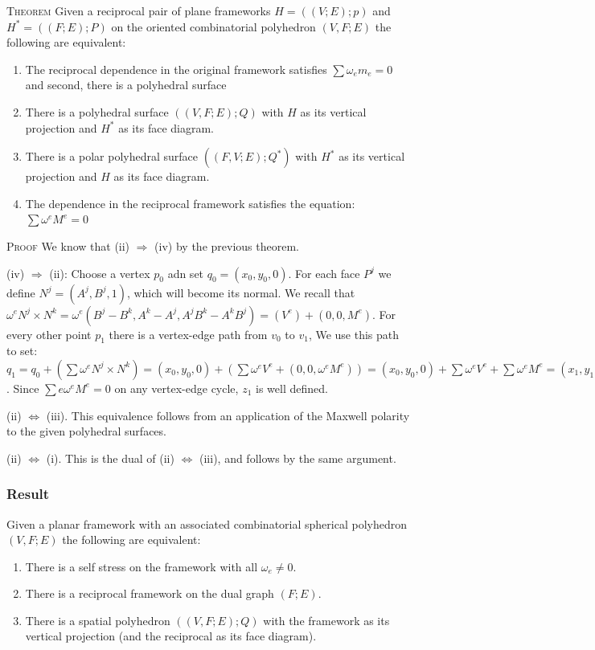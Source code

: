 \documentclass[11pt]{article}
\begin{document}
 \textsc{Theorem} Given a reciprocal pair of plane frameworks $H=((V;E);p)$ and $H^* = ((F;E);P)$ on the oriented combinatorial polyhedron $(V,F;E)$ the following are equivalent: 
 \begin{enumerate} 
 	\item The reciprocal dependence in the original framework satisfies $\sum \omega_em_e = 0$ and second, there is a polyhedral surface 
 	\item There is a polyhedral surface $((V,F;E);Q)$ with $H$ as its vertical projection and $H^*$ as its face diagram.
	\item There is a polar polyhedral surface $((F,V;E);Q^*)$ with $H^*$ as its vertical projection and $H$ as its face diagram.
	\item The dependence in the reciprocal framework satisfies the equation: $\sum \omega^eM^e = 0$
\end{enumerate}
\textsc{Proof} We know that (ii) $\Rightarrow$ (iv) by the previous theorem. 

(iv) $\Rightarrow$ (ii): Choose a vertex $p_0$ adn set $q_0 = (x_0, y_0,0)$. For each face $P^j$ we define $N^j = (A^j,B^j,1)$, which will become its normal. We recall that $\omega^eN^j \times N^k = \omega^e(B^j-B^k,A^k-A^j, A^jB^k-A^kB^j) = (V^e) + (0,0,M^e)$. For every other point $p_1$ there is a vertex-edge path from $v_0$ to $v_1$, We use this path to set: $q_1 = q_0 + (\sum \omega^eN^j \times N^k) = (x_0,y_0,0) + (\sum \omega^eV^e + (0,0,\omega^eM^e)) = (x_0,y_0,0) + \sum \omega^eV^e + \sum \omega^eM^e = (x_1,y_1,0) + (0,0,\sum \omega_eM^e)$. Since $\sum{e}\omega^eM^e = 0$ on any vertex-edge cycle, $z_1$ is well defined.

(ii) $\Leftrightarrow$ (iii). This equivalence follows from an application of the Maxwell polarity to the given polyhedral surfaces.

(ii) $\Leftrightarrow$ (i). This is the dual of (ii) $\Leftrightarrow$ (iii), and follows by the same argument. 

 
 
\subsubsection{Result}

Given a planar framework with an associated combinatorial spherical polyhedron $(V,F;E)$ the following are equivalent:
\begin{enumerate}
	\item There is a self stress on the framework with all $\omega_e \neq 0$.
	\item There is a reciprocal framework on the dual graph $(F;E)$.
	\item There is a spatial polyhedron $((V,F;E);Q)$ with the framework as its vertical projection (and the reciprocal as its face diagram).
 \end{enumerate}
 
\end{document}
